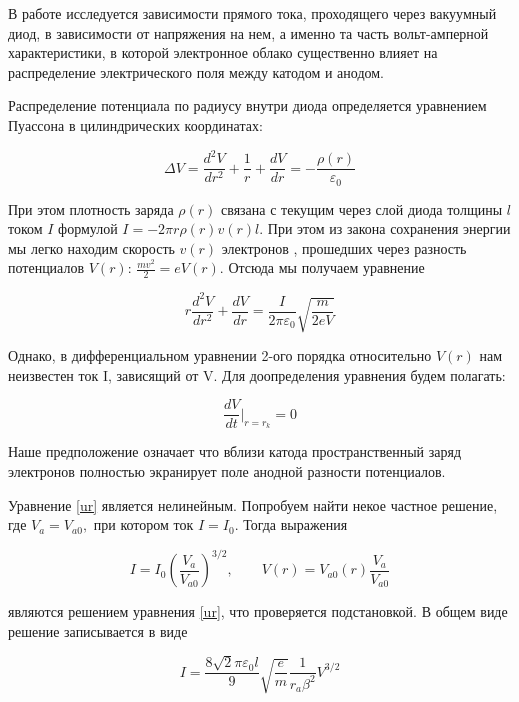 \documentclass[a4paper, 12pt]{article}
\begin{document}
	В работе исследуется зависимости прямого тока, проходящего через вакуумный диод, в зависимости от напряжения на нем, а именно та часть вольт-амперной характеристики, в которой электронное облако существенно влияет на распределение электрического поля между катодом и анодом.
	
	Распределение потенциала по радиусу внутри диода определяется уравнением Пуассона в цилиндрических координатах:
	
	\begin{equation}\label{}
		\Delta V = \dfrac{d^2V}{dr^2} + \dfrac{1}{r} + \dfrac{dV}{dr} = - \dfrac{\rho(r)}{\varepsilon_0}
	\end{equation}
	
	При этом плотность заряда $ \rho(r) $ связана с текущим через слой диода толщины $ l $ током $ I $ формулой $ I = -2\pi r \rho(r)v(r)l$. При этом из закона сохранения энергии мы легко находим скорость $ v(r) $ электронов , прошедших через разность потенциалов $ V(r) $: $ \frac{mv^2}{2} = eV(r) $.  Отсюда мы получаем уравнение 
	
	\begin{equation}\label{ur}
	r \dfrac{d^2V}{dr^2} + \dfrac{dV}{dr} = \dfrac{I}{2\pi\varepsilon_0}\sqrt{\dfrac{m}{2eV}}
	\end{equation}
	
	Однако, в дифференциальном уравнении 2-ого порядка относительно $ V(r) $ нам неизвестен ток I, зависящий от V. Для доопределения уравнения будем полагать:
	
	\begin{equation}\label{usl}
	\dfrac{dV}{dt}\bigg |_{r=r_k} = 0
	\end{equation} 
	
	Наше предположение означает что вблизи катода пространственный заряд электронов полностью экранирует поле анодной разности потенциалов.
	
	Уравнение \eqref{ur} является нелинейным. Попробуем  найти некое частное решение, где $ V_a = V_{a0}, $ при котором ток $ I = I_0 $. Тогда выражения 
	
	\begin{equation}\label{}
	I = I_0 \left( \dfrac{V_a}{V_{a0}} \right) ^{3/2}, \qquad V(r) = V_{a0}(r)\dfrac{V_a}{V_{a0}}
	\end{equation}
	
	являются решением уравнения \eqref{ur}, что проверяется подстановкой. В общем виде решение записывается в виде
	
	\begin{equation}\label{3/2}
	I = \dfrac{8\sqrt{2}\pi \varepsilon_0 l}{9}\sqrt{\dfrac{e}{m}}\dfrac{1}{r_a\beta^2} V^{3/2}
	\end{equation}
	
\end{document}
